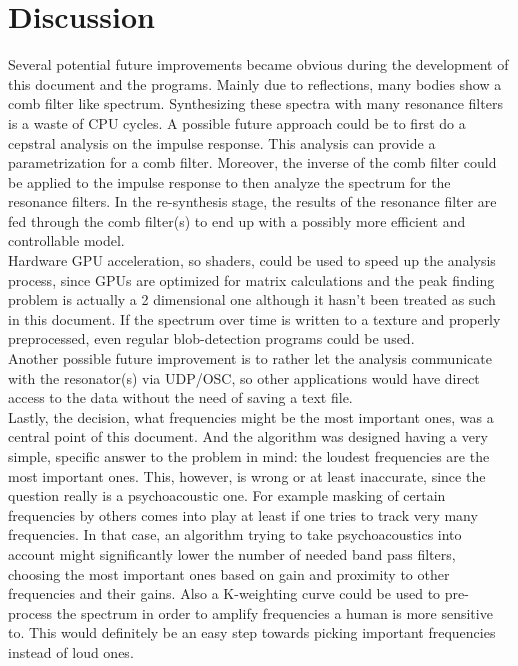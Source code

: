 \chapter{Discussion}
\label{sec:discussion}
Several potential future improvements became obvious during the development of this document and the programs. Mainly due to reflections, many bodies show a comb filter like spectrum. Synthesizing these spectra with  many resonance filters is a waste of CPU cycles. A possible future approach could be to first do a cepstral analysis on the impulse response. This analysis can provide a parametrization for a comb filter. Moreover, the inverse of the comb filter could be applied to the impulse response to then analyze the spectrum for the resonance filters. In the re-synthesis stage, the results of the resonance filter are fed through the comb filter(s) to end up with a possibly more efficient and controllable model.\\
Hardware GPU acceleration, so shaders, could be used to speed up the analysis process, since GPUs are optimized for matrix calculations and the peak finding problem is actually a 2 dimensional one although it hasn't been treated as such in this document. If the spectrum over time is written to a texture and properly preprocessed, even regular blob-detection programs could be used.\\
Another possible future improvement is to rather let the analysis communicate with the resonator(s) via UDP/OSC, so other applications would have direct access to the data without the need of saving a text file. \\
Lastly, the decision, what frequencies might be the most important ones, was a central point of this document. And the algorithm was designed having a very simple, specific answer to the problem in mind: the loudest frequencies are the most important ones. This, however, is wrong or at least inaccurate, since the question really is a psychoacoustic one. For example masking of certain frequencies by others comes into play at least if one tries to track very many frequencies. In that case, an algorithm trying to take psychoacoustics into account might significantly lower the number of needed band pass filters, choosing the most important ones based on gain and proximity to other frequencies and their gains. Also a K-weighting curve could be used to pre-process the spectrum in order to amplify frequencies a human is more sensitive to. This would definitely be an easy step towards picking important frequencies instead of loud ones.

